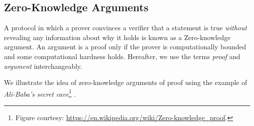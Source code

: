 \subsection{Zero-Knowledge Arguments}

A protocol in which a prover convinces a verifier that a statement
is true \textit{without} revealing any information about why it holds is known as a Zero-knowledge argument. An argument is a proof only if the prover is computationally bounded and some computational hardness holds. Hereafter, we use the terms \textit{proof} and \textit{argument} interchangeably. 

We illustrate the idea of zero-knowledge arguments of proof using the example of \textit{Ali-Baba's secret cave}\footnote{Figure courtesy: \url{https://en.wikipedia.org/wiki/Zero-knowledge_proof}.} \cite{jean89}.

